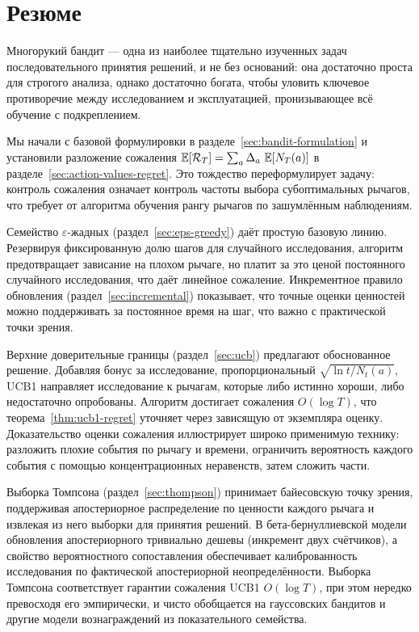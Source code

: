 \section{Резюме}
\label{sec:bandit-summary}

Многорукий бандит — одна из наиболее тщательно изученных задач последовательного принятия решений, и не без оснований: она достаточно проста для строгого анализа, однако достаточно богата, чтобы уловить ключевое противоречие между исследованием и эксплуатацией, пронизывающее всё обучение с подкреплением.

Мы начали с базовой формулировки в разделе~\ref{sec:bandit-formulation} и установили разложение сожаления $\operatorname{\mathbb{E}}[\mathcal{R}_T]=\sum_a\Delta_a\,\operatorname{\mathbb{E}}[N_T(a)]$ в разделе~\ref{sec:action-values-regret}.  Это тождество переформулирует задачу: контроль сожаления означает контроль частоты выбора субоптимальных рычагов, что требует от алгоритма обучения рангу рычагов по зашумлённым наблюдениям.

Семейство $\varepsilon$-жадных (раздел~\ref{sec:eps-greedy}) даёт простую базовую линию.  Резервируя фиксированную долю шагов для случайного исследования, алгоритм предотвращает зависание на плохом рычаге, но платит за это ценой постоянного случайного исследования, что даёт линейное сожаление.  Инкрементное правило обновления (раздел~\ref{sec:incremental}) показывает, что точные оценки ценностей можно поддерживать за постоянное время на шаг, что важно с практической точки зрения.

Верхние доверительные границы (раздел~\ref{sec:ucb}) предлагают обоснованное решение.  Добавляя бонус за исследование, пропорциональный $\sqrt{\ln t / N_t(a)}$, UCB1 направляет исследование к рычагам, которые либо истинно хороши, либо недостаточно опробованы.  Алгоритм достигает сожаления $O(\log T)$, что теорема~\ref{thm:ucb1-regret} уточняет через зависящую от экземпляра оценку.  Доказательство оценки сожаления иллюстрирует широко применимую технику: разложить плохие события по рычагу и времени, ограничить вероятность каждого события с помощью концентрационных неравенств, затем сложить части.

Выборка Томпсона (раздел~\ref{sec:thompson}) принимает байесовскую точку зрения, поддерживая апостериорное распределение по ценности каждого рычага и извлекая из него выборки для принятия решений.  В бета-бернуллиевской модели обновления апостериорного тривиально дешевы (инкремент двух счётчиков), а свойство вероятностного сопоставления обеспечивает калиброванность исследования по фактической апостериорной неопределённости.  Выборка Томпсона соответствует гарантии сожаления UCB1 $O(\log T)$, при этом нередко превосходя его эмпирически, и чисто обобщается на гауссовских бандитов и другие модели вознаграждений из показательного семейства.

